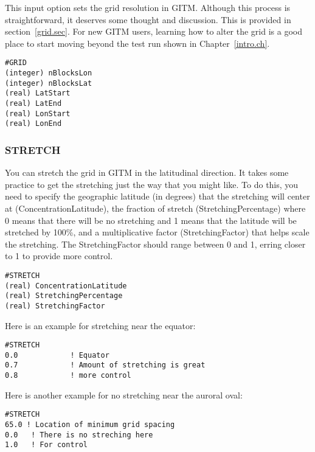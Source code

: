 This input option sets the grid resolution in GITM.  Although this process is straightforward, it deserves some thought and discussion.  This is provided in section~\ref{grid.sec}.  For new GITM users, learning how to alter the grid is a good place to start moving beyond the test run shown in Chapter~\ref{intro.ch}.

\begin{verbatim}
#GRID
(integer) nBlocksLon  
(integer) nBlocksLat  
(real) LatStart   
(real) LatEnd     
(real) LonStart   
(real) LonEnd     
\end{verbatim}

\subsubsection{STRETCH}

You can stretch the grid in GITM in the latitudinal direction.  It takes some practice to get the stretching just the way that you might like.  To do this, you need to specify the geographic latitude (in degrees) that the stretching will center at (ConcentrationLatitude), the fraction of stretch (StretchingPercentage) where 0 means that there will be no stretching and 1 means that the latitude will be stretched by 100\%, and a multiplicative factor (StretchingFactor) that helps scale the stretching.  The StretchingFactor should range between 0 and 1, erring closer to 1 to provide more control.

\begin{verbatim}
#STRETCH
(real) ConcentrationLatitude 
(real) StretchingPercentage 
(real) StretchingFactor  
\end{verbatim}

Here is an example for stretching near the equator:

\begin{verbatim}
#STRETCH
0.0            ! Equator
0.7            ! Amount of stretching is great
0.8            ! more control
\end{verbatim}

Here is another example for no stretching near the auroral oval:

\begin{verbatim}
#STRETCH
65.0 ! Location of minimum grid spacing
0.0	  ! There is no streching here
1.0   ! For control
\end{verbatim}
